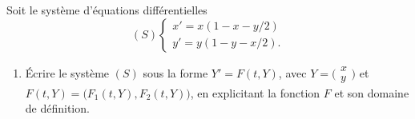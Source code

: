 \ee
\newpage
\be

Soit le système d'équations différentielles
  $$
  (S)\begin{cases}
    x'=x(1-x-y/2)\\
    y'=y(1-y-x/2).
  \end{cases}
  $$
  \begin{enumerate}
    \item
      Écrire le système $(S)$ sous la forme $Y'=F(t,Y)$, avec $Y=\Big(\begin{array}{c}x\\y\end{array}\Big)$ et $F(t,Y)=\big(F_1(t,Y),F_2(t,Y)\big)$, en explicitant la fonction $F$ et son domaine de définition.


\end{enumerate}
